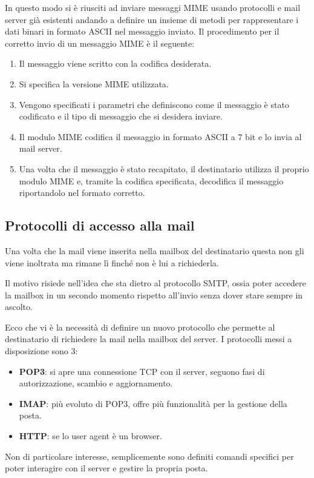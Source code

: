 In questo modo si è riusciti ad inviare messaggi MIME usando protocolli
e mail server già esistenti andando a definire un insieme di metodi per
rappresentare i dati binari in formato ASCII nel messaggio inviato. 
Il procedimento per il corretto invio di un messaggio MIME è il
seguente:
\begin{enumerate}
	\item Il messaggio viene scritto con la codifica desiderata.
	\item Si specifica la versione MIME utilizzata.
	\item Vengono specificati i parametri che definiscono come il 
		messaggio è stato codificato e il tipo di messaggio che si 
		desidera inviare.
	\item Il modulo MIME codifica il messaggio in formato ASCII a 7 
		bit e lo invia al mail server.
	\item Una volta che il messaggio è stato recapitato, il 
		destinatario utilizza il proprio modulo MIME e, tramite la 
		codifica specificata, decodifica il messaggio riportandolo 
		nel formato corretto.
\end{enumerate}

\subsection{Protocolli di accesso alla mail}
Una volta che la mail viene inserita nella mailbox del destinatario 
questa non gli viene inoltrata ma rimane lì finché non è lui a 
richiederla.

Il motivo risiede nell'idea che sta dietro al protocollo SMTP, ossia 
poter accedere la mailbox in un secondo momento rispetto all'invio 
senza dover stare sempre in ascolto.

Ecco che vi è la necessità di definire un nuovo protocollo che permette
al destinatario di richiedere la mail nella mailbox del server. I 
protocolli messi a disposizione sono 3:
\begin{itemize}
	\item \textbf{POP3}: si apre una connessione TCP con il server,
		seguono fasi di autorizzazione, scambio e aggiornamento.
	\item \textbf{IMAP}: più evoluto di POP3, offre più funzionalità 
		per la gestione della posta.
	\item \textbf{HTTP}: se lo user agent è un browser.
\end{itemize}
Non di particolare interesse, semplicemente sono definiti comandi 
specifici per poter interagire con il server e gestire la propria 
posta.
